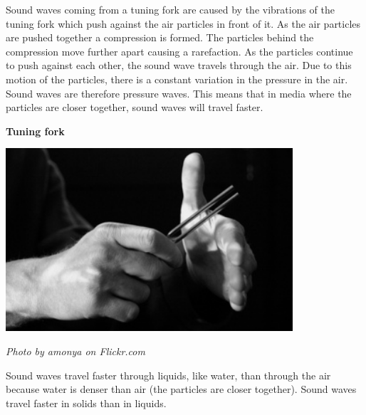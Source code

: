 \begin{minipage}{.5\textwidth}
      \label{m38783*id293458}Sound waves coming from a tuning fork are caused by the vibrations of the tuning fork which push against the air particles in front of it. As the air particles are pushed together a compression is formed. The particles behind the compression move further apart causing a rarefaction. As the particles continue to push against each other,
the sound wave travels through the air. Due to this motion of the particles, there is a constant variation in the pressure in the air. Sound waves are therefore pressure waves. This means that in media where the particles are closer together, sound waves will travel faster.
\end{minipage}
\begin{minipage}{.5\textwidth}\begin{center}
\textbf{Tuning fork}\par
    \includegraphics[width=0.8\textwidth]{photos/TuningFork2_Flickr_amonya.jpg}\par
\textit{Photo by amonya on Flickr.com}
\end{center}
\end{minipage}
      \label{m38783*id293466}Sound waves travel faster through liquids, like water, than through the air because water is denser than air (the particles are closer together). Sound waves travel faster in solids than in liquids.\par 
    \setcounter{subfigure}{0}
